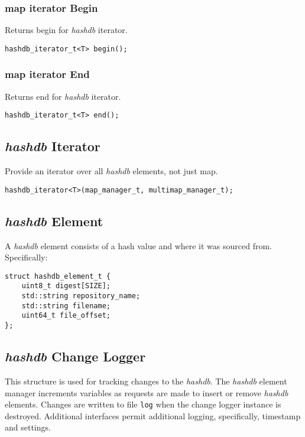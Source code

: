\documentclass[12pt,twoside]{article}
\newcommand{\hdb}{\emph{hashdb}\xspace}
\newcommand{\mi}{\textbf{map iterator}\xspace}
\begin{document}
\subsubsection{\mi Begin}
Returns begin for \hdb iterator.

\begin{small}
\begin{verbatim}
hashdb_iterator_t<T> begin();
\end{verbatim}
\end{small}

\subsubsection{\mi End}
Returns end for \hdb iterator.

\begin{small}
\begin{verbatim}
hashdb_iterator_t<T> end();
\end{verbatim}
\end{small}

\subsection{\hdb Iterator}
Provide an iterator over all \hdb elements, not just map.

\begin{small}
\begin{verbatim}
hashdb_iterator<T>(map_manager_t, multimap_manager_t);
\end{verbatim}
\end{small}

\subsection{\hdb Element}
A \hdb element consists of a hash value and where it was sourced from.
Specifically:
\begin{small}
\begin{verbatim}
struct hashdb_element_t {
    uint8_t digest[SIZE];
    std::string repository_name;
    std::string filename;
    uint64_t file_offset;
};
\end{verbatim}
\end{small}

\subsection{\hdb Change Logger}
This structure is used for tracking changes to the \hdb.
The \hdb element manager increments variables
as requests are made to insert or remove \hdb elements.
Changes are written to file \texttt{log}
when the change logger instance is destroyed.
Additional interfaces permit additional logging,
specifically, timestamp and settings.
\end{document}
